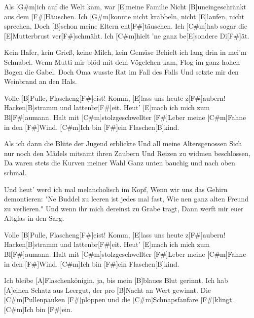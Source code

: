 

\begin{guitar}
	Als [G#m]ich auf die Welt kam, war [E]meine Familie
	Nicht [B]uneingeschränkt aus dem [F#]Häuschen.
	Ich [G#m]konnte nicht krabbeln, nicht [E]laufen, nicht sprechen,
	Doch [B]schon meine Eltern ent[F#]täuschen.
	Ich [C#m]hab sogar die [E]Mutterbrust ver[F#]schmäht.
	Ich [C#m]hielt 'ne ganz be[E]sondere Di[F#]{ä}t.
	
	Kein Hafer, kein Grieß, keine Milch, kein Gemüse
	Behielt ich lang drin in mei'm Schnabel.
	Wenn Mutti mir blöd mit dem Vögelchen kam,
	Flog im ganz hohen Bogen die Gabel.
	Doch Oma wusste Rat im Fall des Falls
	Und setzte mir den Weinbrand an den Hals.
	
	\begin{highlightbar}
		Volle [B]Pulle, Flascheng[F#]eist! Komm, [E]lass uns heute z[F#]aubern!
		Hacken[B]stramm und lattenbr[F#]eit. Heut' [E]mach ich mich zum Bl[F#]aumann.
		Halt mit [C#m]stolzgeschwellter [F#]Leber meine [C#m]Fahne in den [F#]Wind.
		[C#m]Ich bin [F#]ein Flaschen[B]kind.
	\end{highlightbar}
	
	\songsection{Strophe 2}
	Als ich dann die Blüte der Jugend erblickte
	Und all meine Altersgenossen
	Sich nur noch den Mädels mitsamt ihren Zaubern
	Und Reizen zu widmen beschlossen,
	Da waren stets die Kurven meiner Wahl
	Ganz unten bauchig und nach oben schmal.
	
	Und heut' werd ich mal melancholisch im Kopf,
	Wenn wir uns das Gehirn demontieren:
	"Ne Buddel zu leeren ist jedes mal fast,
	Wie nen ganz alten Freund zu verlieren."
	Und wenn ihr mich dereinst zu Grabe tragt,
	Dann werft mir euer Altglas in den Sarg.
	
	\begin{highlightbar}
		 \optionalChord{(x2)}
		Volle [B]Pulle, Flascheng[F#]eist! Komm, [E]lass uns heute z[F#]aubern!
		Hacken[B]stramm und lattenbr[F#]eit. Heut' [E]mach ich mich zum Bl[F#]aumann.
		Halt mit [C#m]stolzgeschwellter [F#]Leber meine [C#m]Fahne in den [F#]Wind.
		[C#m]Ich bin [F#]ein Flaschen[B]kind.
	\end{highlightbar}
	
	Ich bleibe [A]Flaschenkönigin, ja, bis mein [B]blaues Blut gerinnt.
	Ich hab [A]einen Schatz aus Leergut, der pro [B]Nacht an Wert gewinnt.
	Die [C#m]Pullenpauken [F#]ploppen und die [C#m]Schnapsfanfare [F#]klingt.
	[C#m]Ich bin [F#]ein.
	

\end{guitar}

